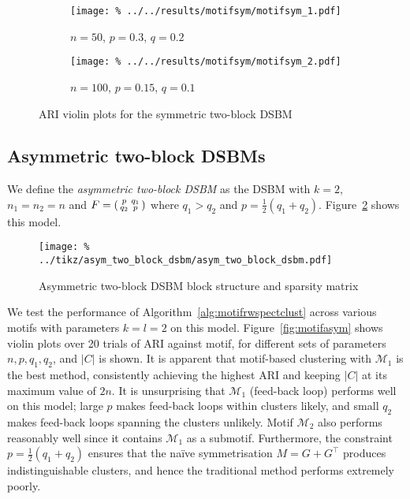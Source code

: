 \documentclass[12pt]{ociamthesis}
\theoremstyle{plain}
\theoremstyle{definition}
\theoremstyle{remark}
\newcommand\ca[1]{\mathcal{#1}}
\begin{document}
\begin{figure}[H]
\begin{subfigure}{.49\textwidth}
\centering
\texttt{[image: \%
../../results/motifsym/motifsym\_1.pdf]}
\caption{$n=50$, $p=0.3$, $q=0.2$}
\end{subfigure}
\begin{subfigure}{.49\textwidth}
\centering
\texttt{[image: \%
../../results/motifsym/motifsym\_2.pdf]}
\caption{$n=100$, $p=0.15$, $q=0.1$}
\end{subfigure}
\caption{ARI violin plots for the symmetric two-block DSBM}
\label{fig:motifsym}
\end{figure}

\subsection{Asymmetric two-block DSBMs} \label{sec:motif_asymm_dsbms}

We define the \emph{asymmetric two-block DSBM} as the DSBM with $k=2$,
$n_1=n_2=n$ and
$F =
\begin{psmallmatrix}
p & q_1 \\ q_2 & p
\end{psmallmatrix}$
where $q_1 > q_2$ and $p = \frac{1}{2}(q_1+q_2)$.
Figure~\ref{fig:asym_two_block_dsbm} shows this model.

\begin{figure}[H]
\centering
\texttt{[image: \%
../tikz/asym\_two\_block\_dsbm/asym\_two\_block\_dsbm.pdf]}
\caption{Asymmetric two-block DSBM block structure and sparsity matrix}
\label{fig:asym_two_block_dsbm}
\end{figure}

We test the performance of Algorithm~\ref{alg:motifrwspectclust} across various
motifs with parameters $k=l=2$ on this model.
Figure~\ref{fig:motifasym} shows violin plots over 20 trials of ARI against
motif, for different sets of parameters $n,p,q_1,q_2$, and $|C|$ is shown.
It is apparent that motif-based clustering with $\ca{M}_1$ is the best method,
consistently achieving the highest ARI and keeping $|C|$ at its maximum value
of $2n$.
It is unsurprising that $\ca{M}_1$ (feed-back loop) performs well on this
model; large $p$ makes feed-back loops within clusters likely, and small $q_2$
makes feed-back loops spanning the clusters unlikely. Motif $\ca{M}_2$ also
performs reasonably well since it contains $\ca{M}_1$ as a submotif.
Furthermore, the constraint $p = \frac{1}{2}(q_1+q_2)$ ensures that the na\"ive
symmetrisation $M=G+G^\top$ produces indistinguishable clusters, and hence the
traditional method performs extremely poorly.
\end{document}
